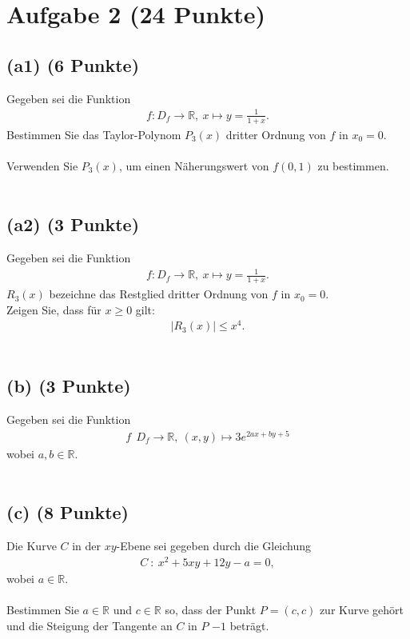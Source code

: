 \section*{Aufgabe 2 (24 Punkte)}
\vspace{0.4cm}
\subsection*{(a1) (6 Punkte)}
Gegeben sei die Funktion
\begin{align*}
f: D_f \to \mathbb{R}, \ x \mapsto y= \frac{1}{1+x}.
\end{align*}
Bestimmen Sie das Taylor-Polynom $P_3(x)$ dritter Ordnung von $f$ in $x_0 = 0$.\\
\\
Verwenden Sie $P_3(x)$, um einen Näherungswert von $f(0,1)$ zu bestimmen.
\\
\\
\subsection*{(a2) (3 Punkte)}
Gegeben sei die Funktion
\begin{align*}
f: D_f \to \mathbb{R}, \ x \mapsto y= \frac{1}{1+x}.
\end{align*}
$R_3(x)$ bezeichne das Restglied dritter Ordnung von $f$ in $x_0=0$.\\
Zeigen Sie, dass für $x \geq 0 $ gilt:
\begin{align*}
|R_3(x)| \leq x^4.
\end{align*}
\\

\subsection*{(b) (3 Punkte)}
Gegeben sei die Funktion
\begin{align*}
f\: \ D_f \to \mathbb{R}, \ (x,y) \mapsto 3 e^{2ax+by+5} 
\end{align*}
wobei $a,b \in \mathbb{R}$.
\\
\\
\subsection*{(c) (8 Punkte)}
Die Kurve $C$ in der $xy$-Ebene sei gegeben durch die Gleichung
\begin{align*}
C  \ : \ x^2+5xy+12y-a= 0,
\end{align*}
wobei $a \in \mathbb{R}$.\\
\\
Bestimmen Sie $a \in \mathbb{R}$ und $c \in \mathbb{R}$ so, dass
der Punkt $P = (c,c)$ zur Kurve gehört und die Steigung der Tangente an $C$ in $P$ $-1$ beträgt.
\\
\\
